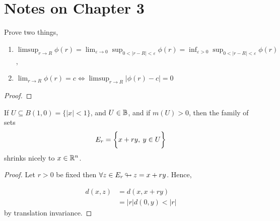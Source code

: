 \documentclass[../../main.tex]{subfiles}
\begin{document}
\section*{Notes on Chapter 3}
\begin{wts}
    Prove two things,
    \begin{enumerate}
        \item $\limsup_{r\to R}\phi(r)=\lim_{\varepsilon\to 0}\sup_{0<|r-R|<\varepsilon}\phi(r)=\inf_{\varepsilon>0}\sup_{0<|r-R|<\varepsilon}\phi(r)$,
        \item $\lim_{r\to R}\phi(r)=c\iff \limsup_{r\to R}|\phi(r)-c|=0$
    \end{enumerate}
\end{wts}
\begin{proof}
    
\end{proof}



\newpage
\begin{wts}
    If $U\subseteq B(1,0)=\{|x|<1\}$, and $U\in{\mathbb{B}}$, and if $m(U)>0$, then the family of sets 
    \[
    E_r = \biggl\{{x+ry,\:y\in U}\biggr\}
    \]
    shrinks nicely to $x\in{\mathbb{R}^n}$.
\end{wts}
\begin{proof}
    Let $r>0$ be fixed then $\forall z\in E_r{\:\looparrowright\:} z = x+ry$. Hence,
    
    \begin{align*}
        d(x,z) &= d(x, x + ry)\\
                &= |r|d(0,y)<|r|
    \end{align*}
    by translation invariance.
\end{proof}
\newpage
\end{document}
